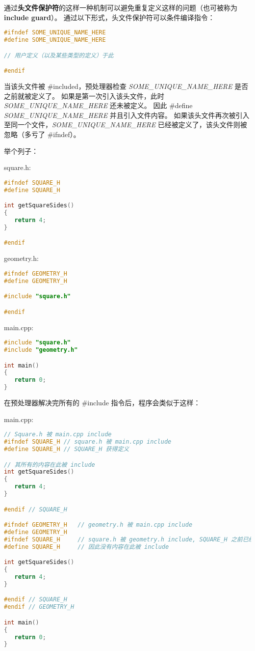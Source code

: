 \documentclass[../../LearnCpp.tex]{subfiles}
\begin{document}

通过\textbf{头文件保护符}的这样一种机制可以避免重复定义这样的问题（也可被称为 \textbf{include guard}）。
通过以下形式，头文件保护符可以条件编译指令：

\begin{lstlisting}[language=C++]
#ifndef SOME_UNIQUE_NAME_HERE
#define SOME_UNIQUE_NAME_HERE

// 用户定义（以及某些类型的定义）于此

#endif
\end{lstlisting}

当该头文件被 \#included，预处理器检查 \textit{SOME\_UNIQUE\_NAME\_HERE} 是否之前就被定义了。
如果是第一次引入该头文件，此时 \textit{SOME\_UNIQUE\_NAME\_HERE} 还未被定义。
因此 \#define \textit{SOME\_UNIQUE\_NAME\_HERE} 并且引入文件内容。
如果该头文件再次被引入至同一个文件，\textit{SOME\_UNIQUE\_NAME\_HERE} 已经被定义了，该头文件则被忽略（多亏了 \#ifndef）。

举个列子：

square.h:

\begin{lstlisting}[language=C++]
#ifndef SQUARE_H
#define SQUARE_H

int getSquareSides()
{
   return 4;
}

#endif
\end{lstlisting}

geometry.h:

\begin{lstlisting}[language=C++]
#ifndef GEOMETRY_H
#define GEOMETRY_H

#include "square.h"

#endif
\end{lstlisting}

main.cpp:

\begin{lstlisting}[language=C++]
#include "square.h"
#include "geometry.h"

int main()
{
   return 0;
}
\end{lstlisting}

在预处理器解决完所有的 \#include 指令后，程序会类似于这样：

main.cpp:

\begin{lstlisting}[language=C++]
// Square.h 被 main.cpp include
#ifndef SQUARE_H // square.h 被 main.cpp include
#define SQUARE_H // SQUARE_H 获得定义

// 其所有的内容在此被 include
int getSquareSides()
{
   return 4;
}

#endif // SQUARE_H

#ifndef GEOMETRY_H   // geometry.h 被 main.cpp include
#define GEOMETRY_H
#ifndef SQUARE_H     // square.h 被 geometry.h include, SQUARE_H 之前已经被定义过了
#define SQUARE_H     // 因此没有内容在此被 include

int getSquareSides()
{
   return 4;
}

#endif // SQUARE_H
#endif // GEOMETRY_H

int main()
{
   return 0;
}
\end{lstlisting}
\end{document}
